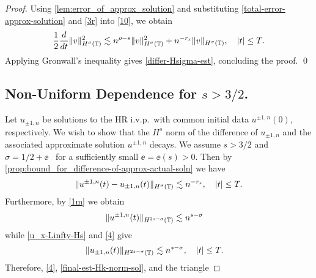\begin{proof}
Using \cref{lem:error_of_approx_solution} and
substituting \eqref{total-error-approx-solution} and \eqref{3r}
into \eqref{10}, we obtain
%
%
\begin{equation}
\begin{split}
\frac{1}{2}\frac{d}{dt}\|v\|_{H^\sigma(\mathbb{T})}^2 \lesssim n^{\rho - s}
\|v\|_{H^\sigma(\mathbb{T})}^2 + n^{-r_s}\|v\|_{H^\sigma(\mathbb{T})}, \quad |t| \le T.
\label{200r}
\end{split}
\end{equation}
%
%
Applying Gronwall's inequality gives \eqref{differ-Hsigma-est}, concluding 
the proof. \qed 
%
%
%
%
%
%
%

\subsection*{Non-Uniform Dependence for $s > 3/2$.}
%
%
%
Let $u_{\pm 1, n}$ be solutions to the HR i.v.p.\ with common initial data 
$u^{\pm 1,
n}(0)$, respectively.
We wish to show that the $H^s$ norm of the difference of $u_{\pm 1,
n}$ and the associated approximate solution $u^{\pm 1, n}$ decays.
We assume
$s > 3/2 $ and $\sigma = 1/2 + \ee$ \ for a sufficiently small
$\ee= \ee(s) > 0$. 
Then by \cref{prop:bound_for_difference-of-approx-actual-soln} we 
have
%
%
\begin{equation}
\begin{split}
\|u^{\pm 1, n}(t) - u_{\pm 1, n} (t) \|_{H^\sigma (\mathbb{T})} \lesssim n^{-r_s}
\label{6h}, \quad |t| \le T.
\end{split}
\end{equation}
%
%
Furthermore, by \eqref{1m} we obtain
%
%
\begin{equation}
\begin{split}
\|u^{\pm 1, n} (t) \|_{H^{2s - \sigma} (\mathbb{T})}
& \lesssim n^{s-\sigma}
\label{4}
\end{split}
\end{equation}
%
%
while \eqref{u_x-Linfty-Hs} and \eqref{4} give
\begin{equation}
\begin{split}
\|u_{\pm 1, n} (t) \|_{H^{2s - \sigma}(\mathbb{T})}
& \lesssim n^{s- \sigma}, \quad |t| \le T.
\label{final-est-Hk-norm-sol}
\end{split}
\end{equation}
%
%
%
%
%
%
%
Therefore, \eqref{4}, \eqref{final-est-Hk-norm-sol}, and the triangle

\end{proof}
